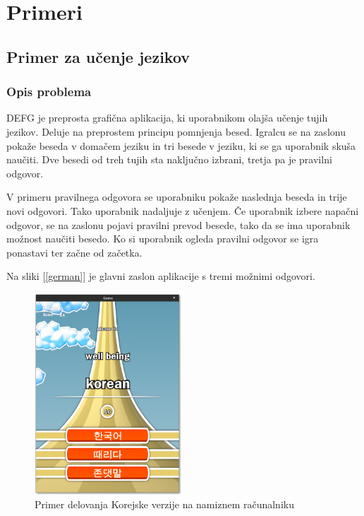 \chapter{Primeri}

\section{Primer za učenje jezikov}

\subsection{Opis problema}

DEFG je preprosta grafična aplikacija, ki uporabnikom olajša učenje tujih jezikov. Deluje na preprostem principu pomnjenja besed. Igralcu se na zaslonu pokaže beseda v domačem jeziku in tri besede v jeziku, ki se ga uporabnik skuša naučiti. Dve besedi od treh tujih sta naključno izbrani, tretja pa je pravilni odgovor.

V primeru pravilnega odgovora se uporabniku pokaže naslednja beseda in trije novi odgovori. Tako uporabnik nadaljuje z učenjem. Če uporabnik izbere napačni odgovor, se na zaslonu pojavi pravilni prevod besede, tako da se ima uporabnik možnost naučiti besedo. Ko si uporabnik ogleda pravilni odgovor se igra ponastavi ter začne od začetka.

Na sliki [\ref{german}] je glavni zaslon aplikacije s tremi možnimi odgovori.

\begin{figure}
\begin{center}
\includegraphics[width=5.5cm]{pic/defg-korean.png}
\end{center}
\caption{Primer delovanja Korejske verzije na namiznem računalniku}
\label{korean}
\end{figure} 


